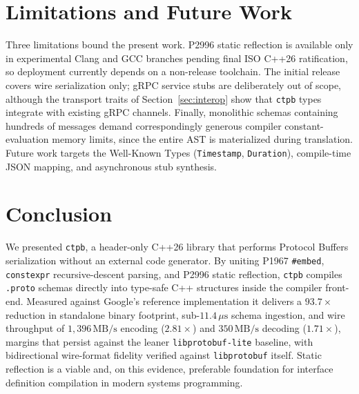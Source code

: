 \section{Limitations and Future Work}

Three limitations bound the present work. P2996 static reflection is available only in experimental Clang and GCC branches pending final ISO C++26 ratification, so deployment currently depends on a non-release toolchain. The initial release covers wire serialization only; gRPC service stubs are deliberately out of scope, although the transport traits of Section~\ref{sec:interop} show that \texttt{ctpb} types integrate with existing gRPC channels. Finally, monolithic schemas containing hundreds of messages demand correspondingly generous compiler constant-evaluation memory limits, since the entire AST is materialized during translation. Future work targets the Well-Known Types (\texttt{Timestamp}, \texttt{Duration}), compile-time JSON mapping, and asynchronous stub synthesis.

\section{Conclusion}
We presented \texttt{ctpb}, a header-only C++26 library that performs Protocol Buffers serialization without an external code generator. By uniting P1967 \texttt{\#embed}, \texttt{constexpr} recursive-descent parsing, and P2996 static reflection, \texttt{ctpb} compiles \texttt{.proto} schemas directly into type-safe C++ structures inside the compiler front-end. Measured against Google's reference implementation it delivers a $93.7\times$ reduction in standalone binary footprint, sub-$11.4\,\mu\text{s}$ schema ingestion, and wire throughput of $1{,}396\,\text{MB/s}$ encoding ($2.81\times$) and $350\,\text{MB/s}$ decoding ($1.71\times$), margins that persist against the leaner \texttt{libprotobuf-lite} baseline, with bidirectional wire-format fidelity verified against \texttt{libprotobuf} itself. Static reflection is a viable and, on this evidence, preferable foundation for interface definition compilation in modern systems programming.
